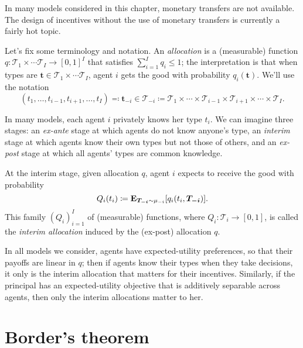 In many models considered in this chapter, monetary transfers are not available.
The design of incentives without the use of monetary transfers is currently a fairly hot topic.


Let's fix some terminology and notation.
An \emph{allocation} is a (measurable) function $q : \mathcal{T}_1 \times \cdots \mathcal{T}_I \to [0,1]^I$ that satisfies $\sum_{i=1}^I q_i \leq 1$;
the interpretation is that when types are $\boldsymbol{t} \in \mathcal{T}_1 \times \cdots \mathcal{T}_I$, agent $i$ gets the good with probability $q_i(\boldsymbol{t})$.
We'll use the notation
%
\begin{equation*}
	(t_1,\dots,t_{i-1},t_{i+1},\dots,t_I)
	\eqqcolon \boldsymbol{t}_{-i}
	\in \mathcal{T}_{-i}
	\coloneqq \mathcal{T}_1 \times \cdots \times \mathcal{T}_{i-1}
	\times \mathcal{T}_{i+1} \times \cdots \times \mathcal{T}_I .
\end{equation*}

In many models, each agent $i$ privately knows her type $t_i$.
We can imagine three stages:
an \emph{ex-ante} stage at which agents do not know anyone's type,
an \emph{interim} stage at which agents know their own types but not those of others,
and an \emph{ex-post} stage at which all agents' types are common knowledge.

At the interim stage, given allocation $q$, agent $i$ expects to receive the good with probability
%
\begin{equation*}
	Q_i(t_i)
	\coloneqq \E_{\boldsymbol{T_{-i}} \sim \mu_{-i}}\left[ q_i(t_i,\boldsymbol{T_{-i}}) \right] .
\end{equation*}
%
This family $(Q_i)_{i=1}^I$ of (measurable) functions, where $Q_i : \mathcal{T}_i \to [0,1]$,
is called the \emph{interim allocation} induced by the (ex-post) allocation $q$.

In all models we consider, agents have expected-utility preferences, so that their payoffs are linear in $q$; then if agents know their types when they take decisions, it only is the interim allocation that matters for their incentives.
Similarly, if the principal has an expected-utility objective that is additively separable across agents, then only the interim allocations matter to her.



\section{Border's theorem}
\label{sec:ch2:border}

